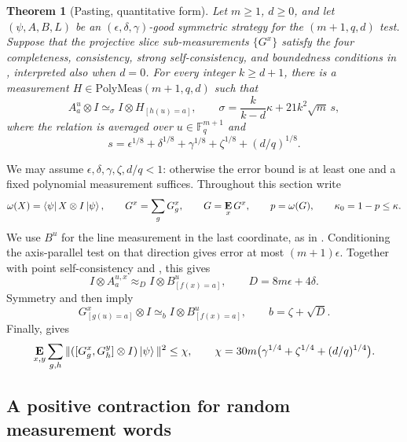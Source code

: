 \documentclass[11pt]{article}
\newtheorem{theorem}{Theorem}[section]
\theoremstyle{definition}
\newcommand{\E}{\mathop{\bf E\/}}
\newcommand{\F}{\mathbb F}
\newcommand{\eps}{\epsilon}
\newcommand{\polymeas}[3]{\mathrm{PolyMeas}(#1, #2, #3)}
\begin{document}
\begin{theorem}[Pasting, quantitative form]\label{thm:ld-pasting}
Let $m\geq1$, $d\geq0$, and let $(\psi,A,B,L)$ be an
$(\eps,\delta,\gamma)$-good symmetric strategy for the $(m+1,q,d)$ test.
Suppose that the projective slice sub-measurements $\{G^x\}$ satisfy
the four completeness, consistency, strong self-consistency, and
boundedness conditions in ,
interpreted also when $d=0$.
For every integer $k\geq d+1$, there is a measurement
$H\in\polymeas{m+1}{q}{d}$ such that
\begin{equation}\label{eq:new-pasting-conclusion}
 A^u_a\otimes I\simeq_\sigma I\otimes H_{[h(u)=a]},
 \qquad
 \sigma=\frac{k}{k-d}\kappa+21k^2\sqrt m\,s,
\end{equation}
where the relation is averaged over $u\in\F_q^{m+1}$ and
\[
 s=\eps^{1/8}+\delta^{1/8}+\gamma^{1/8}
   +\zeta^{1/8}+(d/q)^{1/8}.
\]
\end{theorem}

We may assume $\eps,\delta,\gamma,\zeta,d/q<1$: otherwise the error
bound is at least one and a fixed polynomial measurement suffices.
Throughout this section write
\[
 \omega(X)=\bra\psi X\otimes I\ket\psi,\qquad
 G^x=\sum_gG_g^x,\qquad G=\E_xG^x,\qquad
 p=\omega(G),\qquad\kappa_0=1-p\leq\kappa.
\]
We use $B^u$ for the line measurement in the last coordinate, as in
.  Conditioning the
axis-parallel test on that direction gives error at most $(m+1)\eps$.
Together with point self-consistency and
,
this gives
\begin{equation}\label{eq:ld-abcon}
 I\otimes A^{u,x}_a\approx_D I\otimes B^u_{[f(x)=a]},
 \qquad D=8m\eps+4\delta.
\end{equation}
Symmetry and  then imply
\begin{equation}\label{eq:ld-gbcon}
 G^x_{[g(u)=a]}\otimes I\simeq_b I\otimes B^u_{[f(x)=a]},
 \qquad b=\zeta+\sqrt D.
\end{equation}
Finally,  gives
\begin{equation}\label{eq:quote-com-main}
 \E_{x,y}\sum_{g,h}
 \|([G_g^x,G_h^y]\otimes I)\ket\psi\|^2\leq\chi,
 \qquad
 \chi=30m\bigl(\gamma^{1/4}+\zeta^{1/4}+(d/q)^{1/4}\bigr).
\end{equation}

\subsection{A positive contraction for random measurement words}
\label{sec:hat-consistency}
\end{document}
